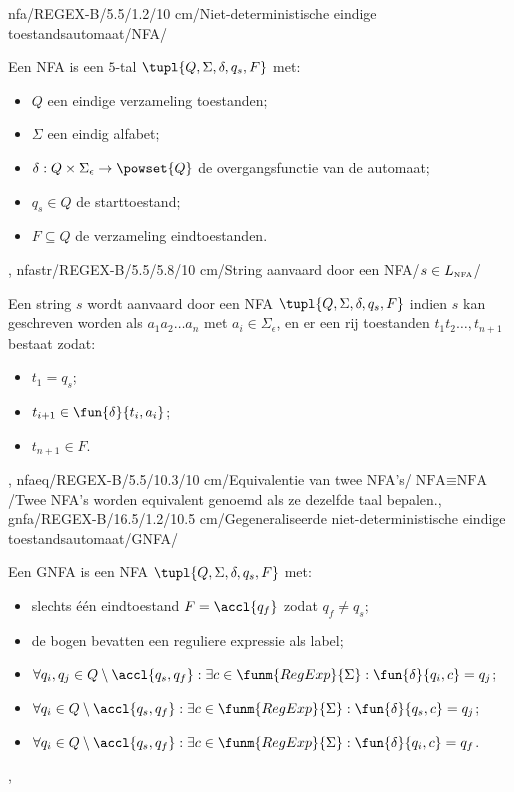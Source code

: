 nfa/REGEX-B/5.5/1.2/10 cm/Niet-deterministische eindige toestandsautomaat/NFA/{Een NFA is een $5$-tal $\tupl{Q,\Sigma,\delta,q_s,F}$ met:\begin{itemize}
 \item $Q$ een eindige verzameling toestanden;
 \item $\Sigma$ een eindig alfabet;
 \item $\delta:Q\times\Sigma_{\epsilon}\rightarrow\powset{Q}$ de overgangsfunctie van de automaat;
 \item $q_s\in Q$ de starttoestand;
 \item $F\subseteq Q$ de verzameling eindtoestanden.
\end{itemize}},
nfastr/REGEX-B/5.5/5.8/10 cm/String aanvaard door een NFA/$s\in L_{\mbox{\tiny NFA}}$/{Een string $s$ wordt aanvaard door een NFA $\tupl{Q,\Sigma,\delta,q_s,F}$ indien $s$ kan geschreven worden als $a_1a_2\ldots a_n$ met $a_i\in\Sigma_{\epsilon}$, en er een rij toestanden $t_1t_2\ldots,t_{n+1}$ bestaat zodat:\begin{itemize}
 \item $t_1=q_s$;
 \item $t_{i+1}\in\fun{\delta}{t_i,a_i}$;
 \item $t_{n+1}\in F$.
\end{itemize}},
nfaeq/REGEX-B/5.5/10.3/10 cm/Equivalentie van twee NFA's/$\mbox{NFA}\equiv\mbox{NFA}$/{Twee NFA's worden equivalent genoemd als ze dezelfde taal bepalen.},
gnfa/REGEX-B/16.5/1.2/10.5 cm/Gegeneraliseerde niet-deterministische eindige toestandsautomaat/GNFA/{Een GNFA is een NFA $\tupl{Q,\Sigma,\delta,q_s,F}$ met:\begin{itemize}
 \item slechts \'e\'en eindtoestand $F=\accl{q_f}$ zodat $q_f\neq q_s$;
 \item de bogen bevatten een reguliere expressie als label;
 \item $\forall q_i,q_j\in Q\setminus\accl{q_s,q_f}:\exists c\in\funm{RegExp}{\Sigma}:\fun{\delta}{q_i,c}=q_j$;
 \item $\forall q_i\in Q\setminus\accl{q_s,q_f}:\exists c\in\funm{RegExp}{\Sigma}:\fun{\delta}{q_s,c}=q_j$;
 \item $\forall q_i\in Q\setminus\accl{q_s,q_f}:\exists c\in\funm{RegExp}{\Sigma}:\fun{\delta}{q_i,c}=q_f$.
\end{itemize}},
